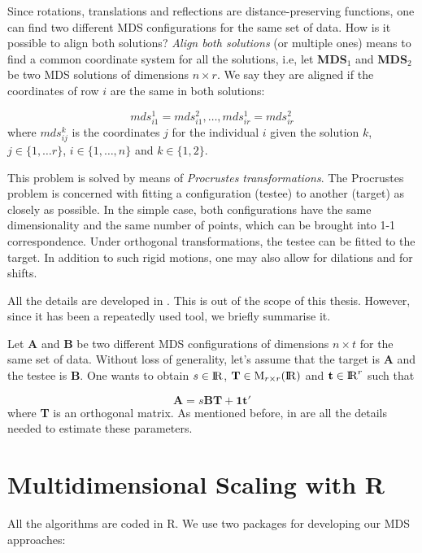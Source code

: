 \documentclass[11pt]{report}
\begin{document}
\indent Since rotations, translations and reflections are distance-preserving 
functions, one can find two different MDS configurations 
for the same set of data. How is it possible to align both solutions? 
\textit{Align both solutions} (or multiple ones) means to find a common 
coordinate system for all the solutions, i.e, let \textbf{MDS$_1$} and 
\textbf{MDS$_2$} be two MDS solutions of dimensions $n \times r$. We say they 
are aligned if the coordinates of row $i$ are the same in both solutions:

\[
mds_{i1}^1 = mds_{i1}^2, \dots, mds_{ir}^1 = mds_{ir}^2
\]
where $mds_{ij}^k$ is the coordinates $j$ for the individual $i$ given the 
solution $k$, $j \in \{1, \dots r\}$, $i \in \{1, \dots, n\}$ and 
$k \in \{1,2\}$.


\indent This problem is solved by means of \textit{Procrustes transformations}.  
The Procrustes problem is concerned with fitting a configuration (testee)
to another (target) as closely as possible. In the simple case, both 
configurations have the same dimensionality and the same number of points, which
can be brought into 1-1 correspondence. Under orthogonal transformations, 
the testee can be fitted to the target. In addition to such rigid motions, 
one may also allow for dilations and for shifts.

\indent All the details are developed in  . This is out 
of the scope of this thesis. However, since it has been a repeatedly used tool, 
we briefly summarise it. 

\indent Let \textbf{A} and \textbf{B} be two different MDS configurations 
of dimensions $n \times t$ for the same set of data. Without loss of generality, 
let's assume that the target is \textbf{A} and the testee is \textbf{B}. 
One wants to obtain $s \in {\rm I\!R}$, 
$\mathbf{T} \in \mbox{M}_{r\times r}({\rm I\!R})$ and 
$\mathbf{t} \in {\rm I\!R}^r$ such that

\[
\mathbf{A} = s \mathbf{B} \mathbf{T} + \mathbf{1t}'
\]
where \textbf{T} is an orthogonal matrix. As mentioned before, 
in  are all the details needed to estimate 
these parameters.

\section{Multidimensional Scaling with \textsf{R}}

All the algorithms are coded in \textsf{R}. We use two 
packages for developing our MDS approaches:
\end{document}
